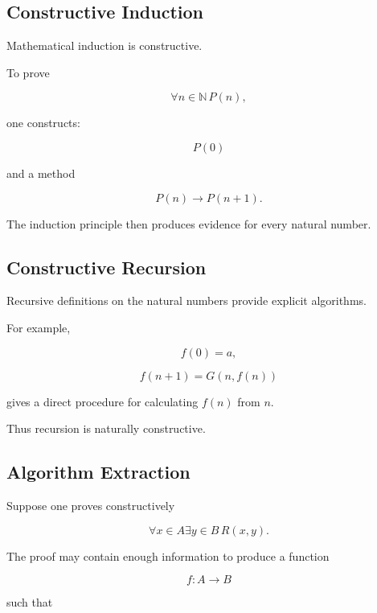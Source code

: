 \subsection{Constructive Induction}
\label{subsec:constructive-induction}

Mathematical induction is constructive.

To prove

\[
\forall n\in\mathbb{N}\,P(n),
\]

one constructs:

\[
\boxed{
P(0)
}
\]

and a method

\[
\boxed{
P(n)
\rightarrow
P(n+1).
}
\]

The induction principle then produces evidence for every natural number.

\subsection{Constructive Recursion}
\label{subsec:constructive-recursion}

Recursive definitions on the natural numbers provide explicit algorithms.

For example,

\[
f(0)=a,
\]

\[
f(n+1)=G(n,f(n))
\]

gives a direct procedure for calculating \(f(n)\) from \(n\).

Thus recursion is naturally constructive.

\subsection{Algorithm Extraction}
\label{subsec:constructive-algorithm-extraction}

Suppose one proves constructively

\[
\boxed{
\forall x\in A
\exists y\in B
\,
R(x,y).
}
\]

The proof may contain enough information to produce a function

\[
\boxed{
f:A\to B
}
\]

such that

